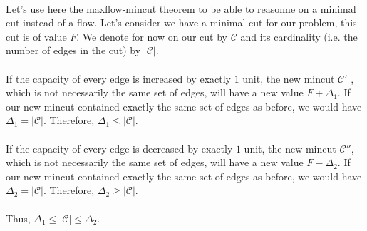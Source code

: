 \paragraph{}
Let's use here the maxflow-mincut theorem to be able to reasonne on a minimal cut instead of a flow. Let's consider we have a minimal cut for our problem, this cut is of value $F$. We denote for now on our cut by $\mathcal{C}$ and its cardinality (i.e. the number of edges in the cut) by $|\mathcal{C}|$.

\paragraph{}
If the capacity of every edge is increased by exactly $1$ unit, the new mincut $\mathcal{C}'$ , which is not necessarily the same set of edges, will have a new value $F + \Delta_{1}$. If our new mincut contained exactly the same set of edges as before, we would have $\Delta_{1} = |\mathcal{C}|$. Therefore, $\Delta_{1} \leqslant |\mathcal{C}|$.

\paragraph{}
If the capacity of every edge is decreased by exactly $1$ unit, the new mincut $\mathcal{C}''$, which is not necessarily the same set of edges, will have a new value $F - \Delta_{2}$. If our new mincut contained exactly the same set of edges as before, we would have $\Delta_{2} = |\mathcal{C}|$. Therefore, $\Delta_{2} \geqslant |\mathcal{C}|$.

\paragraph{}
Thus, $\Delta_{1} \leqslant |\mathcal{C}| \leqslant \Delta_{2}$.
